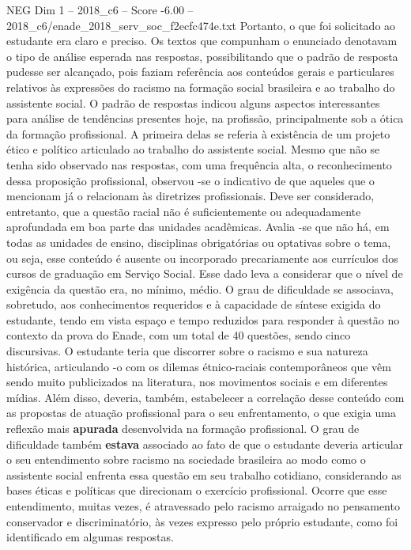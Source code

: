 \begin{textsample}{NEG Dim 1 – 2018\_c6 – Score -6.00 – 2018\_c6/enade\_2018\_serv\_soc\_f2ecfc474e.txt}
Portanto, o que foi solicitado ao estudante era claro e preciso.
Os textos que compunham o enunciado denotavam o tipo de análise esperada nas respostas, possibilitando que o padrão de resposta pudesse ser alcançado, pois faziam referência aos conteúdos gerais e particulares relativos às expressões do racismo na formação social brasileira e ao trabalho do assistente social.
O padrão de respostas indicou alguns aspectos interessantes para análise de tendências presentes hoje, na profissão, principalmente sob a ótica da formação profissional.
A primeira delas se referia à existência de um projeto ético e político articulado ao trabalho do assistente social.
Mesmo que não se tenha sido observado nas respostas, com uma frequência alta, o reconhecimento dessa proposição profissional, observou -se o indicativo de que aqueles que o mencionam já o relacionam às diretrizes profissionais.
Deve ser considerado, entretanto, que a questão racial não é suficientemente ou adequadamente aprofundada em boa parte das unidades acadêmicas.
Avalia -se que não há, em todas as unidades de ensino, disciplinas obrigatórias ou optativas sobre o tema, ou seja, esse conteúdo é ausente ou incorporado precariamente aos currículos dos cursos de graduação em Serviço Social.
Esse dado leva a considerar que o nível de exigência da questão era, no mínimo, médio.
O grau de dificuldade se associava, sobretudo, aos conhecimentos requeridos e à capacidade de síntese exigida do estudante, tendo em vista espaço e tempo reduzidos para responder à questão no contexto da prova do Enade, com um total de 40 questões, sendo cinco discursivas.
O estudante teria que discorrer sobre o racismo e sua natureza histórica, articulando -o com os dilemas étnico-raciais contemporâneos que vêm sendo muito publicizados na literatura, nos movimentos sociais e em diferentes mídias.
Além disso, deveria, também, estabelecer a correlação desse conteúdo com as propostas de atuação profissional para o seu enfrentamento, o que exigia uma reflexão mais \textbf{apurada} desenvolvida na formação profissional.
O grau de dificuldade também \textbf{estava} associado ao fato de que o estudante deveria articular o seu entendimento sobre racismo na sociedade brasileira ao modo como o assistente social enfrenta essa questão em seu trabalho cotidiano, considerando as bases éticas e políticas que direcionam o exercício profissional.
Ocorre que esse entendimento, muitas vezes, é atravessado pelo racismo arraigado no pensamento conservador e discriminatório, às vezes expresso pelo próprio estudante, como foi identificado em algumas respostas.

\end{textsample}
